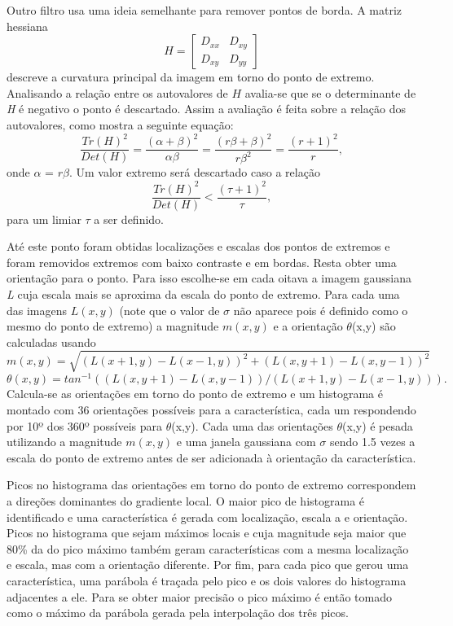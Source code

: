 Outro filtro usa uma ideia semelhante para remover pontos de borda. A matriz hessiana \[ \textit{H} = \left[ \begin{array}{cc}
D_{xx} & D_{xy} \\ 
D_{xy} & D_{yy}
\end{array} \right]  \] descreve a curvatura principal da imagem em torno do ponto de extremo. Analisando a relação entre os autovalores de $\textit{H}$ avalia-se que se o determinante de \textit{H} é negativo o ponto é descartado. Assim a avaliação é feita sobre a relação dos autovalores, como mostra a seguinte equação: \begin{equation}\label{equacaoseg}
\frac{\textit{Tr}(H)^2}{\textit{Det}(H)} = \frac{(\alpha + \beta)^2}{\alpha\beta} = \frac{(r\beta + \beta)^2}{r\beta^2} = \frac{(r + 1)^2}{r}, 
\end{equation} 
onde $\alpha$ = $r\beta$. Um valor extremo será descartado caso a relação \[ \frac{\textit{Tr}(H)^2}{\textit{Det}(H)} < \frac{(\tau + 1)^2}{\tau}, \] para um limiar $\tau$ a ser definido.  

Até este ponto foram obtidas localizações e escalas dos pontos de extremos e foram removidos extremos com baixo contraste e em bordas. Resta obter uma orientação para o ponto. Para isso escolhe-se em cada oitava a imagem gaussiana \textit{L} cuja escala mais se aproxima da escala do ponto de extremo. Para cada uma das imagens $\textit{L}(x,y)$  (note que o valor de $\sigma$ não aparece pois é definido como o mesmo do ponto de extremo) a magnitude $\textit{m}(x,y)$ e a orientação $\theta$(x,y) são calculadas usando \[ \textit{m}(x,y) = \sqrt{(\textit{L}(x  +1,y) - \textit{L}(x - 1,y))^2 + (\textit{L}(x,y + 1) - \textit{L}(x,y - 1))^2} \] \[ \theta (x,y) = \textit{tan}^{-1}((\textit{L}(x,y +1) - \textit{L}(x,y - 1))/(\textit{L}(x + 1,y) - \textit{L}(x - 1,y))).\]
Calcula-se as orientações em torno do ponto de extremo e um histograma é montado com 36 orientações possíveis para a característica, cada um respondendo por 10º dos 360º possíveis para $\theta$(x,y). Cada uma das orientações $\theta$(x,y) é pesada utilizando a magnitude $\textit{m}(x,y)$ e uma janela gaussiana com $\sigma$ sendo 1.5 vezes a escala do ponto de extremo antes de ser adicionada à orientação da característica.

Picos no histograma das orientações em torno do ponto de extremo correspondem a direções dominantes do gradiente local. O maior pico de histograma é identificado e uma característica é gerada com localização, escala a e orientação. Picos no histograma que sejam máximos locais e cuja magnitude seja maior que 80\% da do pico máximo também geram características com a mesma localização e escala, mas com a orientação diferente. Por fim, para cada pico que gerou uma característica, uma parábola é traçada pelo pico e os dois valores do histograma adjacentes a ele. Para se obter maior precisão o pico máximo é então tomado como o máximo da parábola gerada pela interpolação dos três picos.


